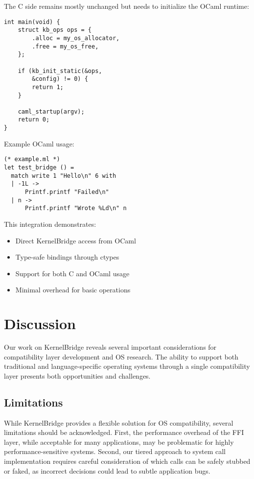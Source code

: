 \documentclass[conference]{IEEEtran}
\begin{document}
The C side remains mostly unchanged but needs
to initialize the OCaml runtime:

\begin{verbatim}
int main(void) {
    struct kb_ops ops = {
        .alloc = my_os_allocator,
        .free = my_os_free,
    };
    
    if (kb_init_static(&ops, 
        &config) != 0) {
        return 1;
    }
    
    caml_startup(argv);
    return 0;
}
\end{verbatim}

Example OCaml usage:

\begin{verbatim}
(* example.ml *)
let test_bridge () =
  match write 1 "Hello\n" 6 with
  | -1L -> 
      Printf.printf "Failed\n"
  | n -> 
      Printf.printf "Wrote %Ld\n" n
\end{verbatim}

This integration demonstrates:
\begin{itemize}
	\item Direct KernelBridge access from OCaml
	\item Type-safe bindings through ctypes
	\item Support for both C and OCaml usage
	\item Minimal overhead for basic operations
\end{itemize}

\section{Discussion}
Our work on KernelBridge reveals several important considerations for compatibility layer development and OS research. The ability to support both traditional and language-specific operating systems through a single compatibility layer presents both opportunities and challenges.

\subsection{Limitations}
While KernelBridge provides a flexible solution for OS compatibility, several limitations should be acknowledged. First, the performance overhead of the FFI layer, while acceptable for many applications, may be problematic for highly performance-sensitive systems. Second, our tiered approach to system call implementation requires careful consideration of which calls can be safely stubbed or faked, as incorrect decisions could lead to subtle application bugs.
\end{document}
